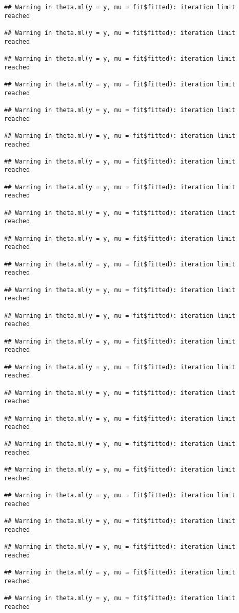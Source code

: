 \documentclass[
]{article}
\begin{document}
\begin{verbatim}
## Warning in theta.ml(y = y, mu = fit$fitted): iteration limit reached

## Warning in theta.ml(y = y, mu = fit$fitted): iteration limit reached

## Warning in theta.ml(y = y, mu = fit$fitted): iteration limit reached

## Warning in theta.ml(y = y, mu = fit$fitted): iteration limit reached

## Warning in theta.ml(y = y, mu = fit$fitted): iteration limit reached

## Warning in theta.ml(y = y, mu = fit$fitted): iteration limit reached

## Warning in theta.ml(y = y, mu = fit$fitted): iteration limit reached

## Warning in theta.ml(y = y, mu = fit$fitted): iteration limit reached

## Warning in theta.ml(y = y, mu = fit$fitted): iteration limit reached

## Warning in theta.ml(y = y, mu = fit$fitted): iteration limit reached

## Warning in theta.ml(y = y, mu = fit$fitted): iteration limit reached

## Warning in theta.ml(y = y, mu = fit$fitted): iteration limit reached

## Warning in theta.ml(y = y, mu = fit$fitted): iteration limit reached

## Warning in theta.ml(y = y, mu = fit$fitted): iteration limit reached

## Warning in theta.ml(y = y, mu = fit$fitted): iteration limit reached

## Warning in theta.ml(y = y, mu = fit$fitted): iteration limit reached

## Warning in theta.ml(y = y, mu = fit$fitted): iteration limit reached

## Warning in theta.ml(y = y, mu = fit$fitted): iteration limit reached

## Warning in theta.ml(y = y, mu = fit$fitted): iteration limit reached

## Warning in theta.ml(y = y, mu = fit$fitted): iteration limit reached

## Warning in theta.ml(y = y, mu = fit$fitted): iteration limit reached

## Warning in theta.ml(y = y, mu = fit$fitted): iteration limit reached

## Warning in theta.ml(y = y, mu = fit$fitted): iteration limit reached

## Warning in theta.ml(y = y, mu = fit$fitted): iteration limit reached


\end{verbatim}
\end{document}
